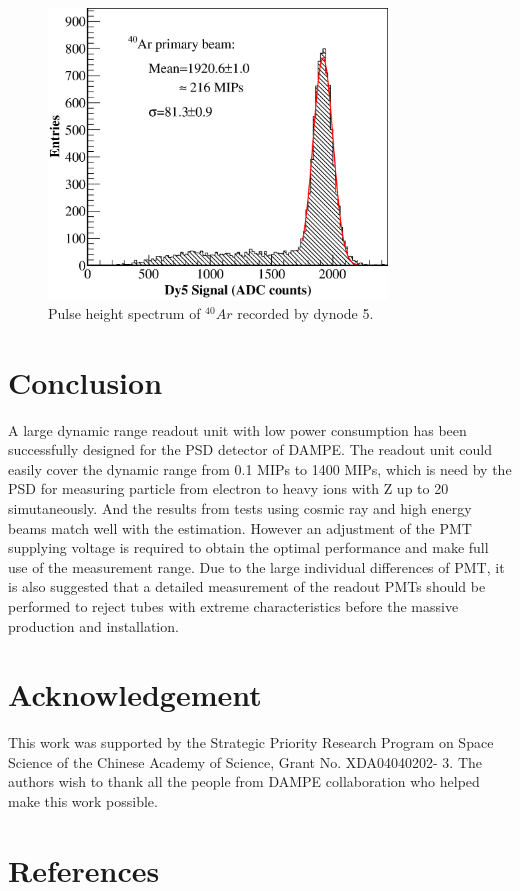 \documentclass[preprint, times]{elsarticle}
\begin{document}
\begin{figure}
 \centering
 \includegraphics[width=90mm]{Ar}
\caption{Pulse height spectrum of $^{40}Ar$ recorded by dynode 5.}
\label{fig:Ar}
\end{figure}

\section{Conclusion}
\label{sec:conclusion}
A large dynamic range readout unit with low power consumption has been successfully designed for the PSD detector of DAMPE.
The readout unit could easily cover the dynamic range from 0.1 MIPs to 1400 MIPs, which is need by the PSD for measuring particle from electron to heavy ions with Z up to 20 simutaneously. And the results from tests using cosmic ray and high energy beams match well with the estimation.
However an adjustment of the PMT supplying voltage is required to obtain the optimal performance and make full use of the measurement range. Due to the large individual differences of PMT, it is also suggested that a detailed measurement of the readout PMTs should be performed to reject tubes with extreme characteristics before the massive production and installation.

\section*{Acknowledgement}
\label{sec:acknowledgement}

This work was supported by the Strategic Priority Research Program on Space Science of the Chinese Academy of Science,
Grant No. XDA04040202- 3.
The authors wish to thank all the people from DAMPE collaboration who helped make this work possible.

\section*{References}
\label{sec:reference}



\end{document}
